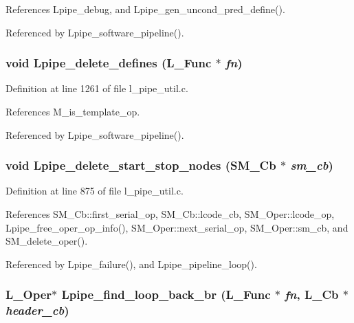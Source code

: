 References Lpipe\_\-debug, and Lpipe\_\-gen\_\-uncond\_\-pred\_\-define().

Referenced by Lpipe\_\-software\_\-pipeline().
\subsubsection{\setlength{\rightskip}{0pt plus 5cm}void Lpipe\_\-delete\_\-defines (L\_\-Func $\ast$ {\em fn})}\label{l__pipe__util_8c_e541b9878cec8748cd7882ee97c7ba4f}




Definition at line 1261 of file l\_\-pipe\_\-util.c.

References M\_\-is\_\-template\_\-op.

Referenced by Lpipe\_\-software\_\-pipeline().
\subsubsection{\setlength{\rightskip}{0pt plus 5cm}void Lpipe\_\-delete\_\-start\_\-stop\_\-nodes (\bf{SM\_\-Cb} $\ast$ {\em sm\_\-cb})}\label{l__pipe__util_8c_e21d164bb9d5070bbf1f2250d5d27501}




Definition at line 875 of file l\_\-pipe\_\-util.c.

References SM\_\-Cb::first\_\-serial\_\-op, SM\_\-Cb::lcode\_\-cb, SM\_\-Oper::lcode\_\-op, Lpipe\_\-free\_\-oper\_\-op\_\-info(), SM\_\-Oper::next\_\-serial\_\-op, SM\_\-Oper::sm\_\-cb, and SM\_\-delete\_\-oper().

Referenced by Lpipe\_\-failure(), and Lpipe\_\-pipeline\_\-loop().
\subsubsection{\setlength{\rightskip}{0pt plus 5cm}L\_\-Oper$\ast$ Lpipe\_\-find\_\-loop\_\-back\_\-br (L\_\-Func $\ast$ {\em fn}, L\_\-Cb $\ast$ {\em header\_\-cb})}\label{l__pipe__util_8c_a00a3d794df406f15d3d85b20f483941}




